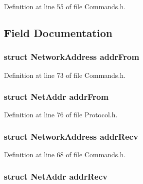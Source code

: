 Definition at line 55 of file Commands.h.



\subsection{Field Documentation}
\hypertarget{struct_cmd_version_a459e4f223be92dc8d26e577d85ba4334}{
\subsubsection[{addrFrom}]{\setlength{\rightskip}{0pt plus 5cm}struct {\bf NetworkAddress} {\bf addrFrom}}}
\label{struct_cmd_version_a459e4f223be92dc8d26e577d85ba4334}


Definition at line 73 of file Commands.h.

\hypertarget{struct_cmd_version_acbbb94e30bbe4e7c99be8e4c61f1e79c}{
\subsubsection[{addrFrom}]{\setlength{\rightskip}{0pt plus 5cm}struct {\bf NetAddr} {\bf addrFrom}}}
\label{struct_cmd_version_acbbb94e30bbe4e7c99be8e4c61f1e79c}


Definition at line 76 of file Protocol.h.

\hypertarget{struct_cmd_version_a1c343f8763f536140c776a99d43ecde3}{
\subsubsection[{addrRecv}]{\setlength{\rightskip}{0pt plus 5cm}struct {\bf NetworkAddress} {\bf addrRecv}}}
\label{struct_cmd_version_a1c343f8763f536140c776a99d43ecde3}


Definition at line 68 of file Commands.h.

\hypertarget{struct_cmd_version_a252b04dc9767f81b38eccddcd72e74ff}{
\subsubsection[{addrRecv}]{\setlength{\rightskip}{0pt plus 5cm}struct {\bf NetAddr} {\bf addrRecv}}}
\label{struct_cmd_version_a252b04dc9767f81b38eccddcd72e74ff}


